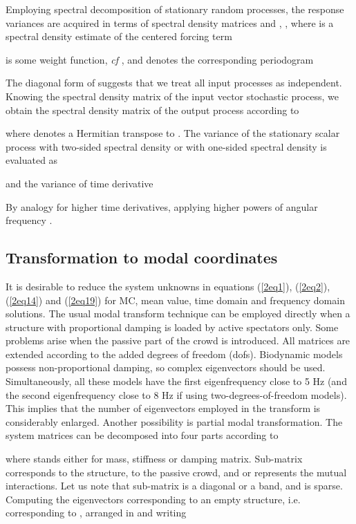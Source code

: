 \documentclass[preprint,12pt,authoryear]{elsarticle}
\begin{document}
Employing spectral decomposition of stationary random processes, the response variances are acquired in terms of spectral density matrices  and , , where  is a spectral density estimate of the centered forcing term

 is some weight function, \textit{cf} \citep{Andel}, and  denotes the corresponding periodogram

The diagonal form of  suggests that we treat all input processes as independent. Knowing the spectral density matrix of the input vector stochastic process, we obtain the spectral density matrix of the output process according to \cite{Soong}

where  denotes a Hermitian transpose to . The variance of the stationary scalar process  with two-sided spectral density  or with one-sided spectral density  is evaluated as

and the variance of time derivative 

By analogy for higher time derivatives, applying higher powers of angular frequency .


\subsection{Transformation to modal coordinates}
\label{modalsol}
It is desirable to reduce the system unknowns in equations (\ref{2eq1}), (\ref{2eq2}), (\ref{2eq14}) and (\ref{2eq19}) for MC, mean value, time domain and frequency domain solutions. The usual modal transform technique can be employed directly when a structure with proportional damping is loaded by active spectators only. Some problems arise when the passive part of the crowd is introduced. All matrices are extended according to the added degrees of freedom (dofs). Biodynamic models possess non-proportional damping, so complex eigenvectors should be used. Simultaneously, all these models have the first eigenfrequency close to 5 Hz (and the second eigenfrequency close to 8 Hz if using two-degrees-of-freedom models). This implies that the number of eigenvectors employed in the transform is considerably enlarged. Another possibility is partial modal transformation. The system matrices can be decomposed into four parts according to

where  stands either for mass, stiffness or damping matrix. Sub-matrix  corresponds to the structure,  to the passive crowd, and  or  represents the mutual interactions. Let us note that sub-matrix  is a diagonal or a band, and  is sparse. Computing the eigenvectors corresponding to an empty structure, i.e. corresponding to , arranged in  and writing
\end{document}
